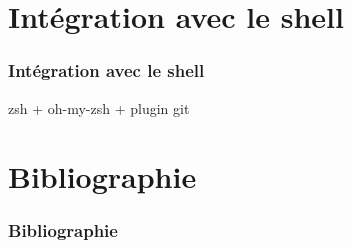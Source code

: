 \documentclass[t,11pt]{beamer}
\begin{document}
\section{Int\'egration avec le shell}
\begin{frame}
        \frametitle{Int\'egration avec le shell}
        zsh + oh-my-zsh + plugin git
\end{frame}

\section{Bibliographie}
\begin{frame}
        \frametitle{Bibliographie}
\end{frame}
\end{document}
